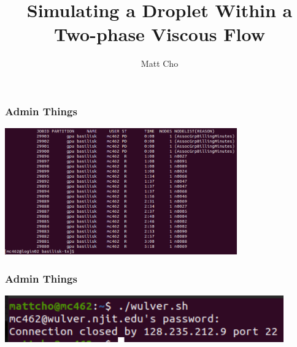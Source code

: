 \documentclass[12pt]{beamer}
\author{Matt Cho}
\title{Simulating a Droplet Within a Two-phase Viscous Flow}
\date{}
\begin{document}
\maketitle

\begin{frame}
    \frametitle{Admin Things}
    \includegraphics[width=0.75\textwidth]{img/8-slurm.png}
\end{frame}
\begin{frame}
    \frametitle{Admin Things}
    \includegraphics[width=0.9\textwidth]{img/9-njit.png}
\end{frame}
\end{document}
